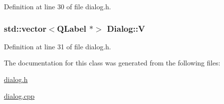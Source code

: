 Definition at line 30 of file dialog.\+h.

\hypertarget{class_dialog_a3876121f29753b2702d6070b8262512f}{
\subsubsection[{V}]{\setlength{\rightskip}{0pt plus 5cm}std\+::vector$<$Q\+Label $\ast$$>$ Dialog\+::\+V\hspace{0.3cm}{\ttfamily [private]}}}\label{class_dialog_a3876121f29753b2702d6070b8262512f}


Definition at line 31 of file dialog.\+h.



The documentation for this class was generated from the following files\+:\begin{DoxyCompactItemize}
\item 
\hyperlink{dialog_8h}{dialog.\+h}\item 
\hyperlink{dialog_8cpp}{dialog.\+cpp}\end{DoxyCompactItemize}
